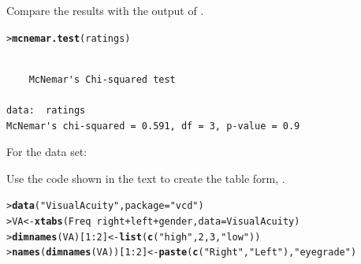 \documentclass[10pt]{report}\usepackage[]{graphicx}\usepackage[]{color}
\makeatletter
\newcommand{\hlnum}[1]{\textcolor[rgb]{0.686,0.059,0.569}{#1}}%
\newcommand{\hlstr}[1]{\textcolor[rgb]{0.192,0.494,0.8}{#1}}%
\newcommand{\hlopt}[1]{\textcolor[rgb]{0,0,0}{#1}}%
\newcommand{\hlstd}[1]{\textcolor[rgb]{0.345,0.345,0.345}{#1}}%
\newcommand{\hlkwb}[1]{\textcolor[rgb]{0.69,0.353,0.396}{#1}}%
\newcommand{\hlkwc}[1]{\textcolor[rgb]{0.333,0.667,0.333}{#1}}%
\newcommand{\hlkwd}[1]{\textcolor[rgb]{0.737,0.353,0.396}{\textbf{#1}}}%
\newenvironment{kframe}{%
 \def\at@end@of@kframe{}%
 \ifinner\ifhmode%
  \def\at@end@of@kframe{\end{minipage}}%
  \begin{minipage}{\columnwidth}%
 \fi\fi%
 \def\FrameCommand##1{\hskip\@totalleftmargin \hskip-\fboxsep
 \colorbox{shadecolor}{##1}\hskip-\fboxsep
     \hskip-\linewidth \hskip-\@totalleftmargin \hskip\columnwidth}%
 \MakeFramed {\advance\hsize-\width
   \@totalleftmargin\z@ \linewidth\hsize
   \@setminipage}}%
 {\par\unskip\endMakeFramed%
 \at@end@of@kframe}
\newenvironment{knitrout}{}{} %
\renewenvironment{knitrout}{\small\renewcommand{\baselinestretch}{.85}}{} %
\makeatother
\begin{document}
\begin{Exercises}
\begin{enumerate*}
\begin{ans}
     \end{ans}
     
     \item Compare the results with the output of .
     \begin{ans}
\begin{knitrout}\footnotesize
{}\color{fgcolor}\begin{kframe}
\begin{alltt}
\hlstd{> }\hlkwd{mcnemar.test}\hlstd{(ratings)}
\end{alltt}
\begin{verbatim}

	McNemar's Chi-squared test

data:  ratings
McNemar's chi-squared = 0.591, df = 3, p-value = 0.9
\end{verbatim}
\end{kframe}
\end{knitrout}
     \end{ans}
     
     \end{enumerate*}

  \exercise For the  data set:
    \begin{enumerate*}
      \item Use the code shown in the text to create the table form, .
      \begin{ans}
\begin{knitrout}\footnotesize
{}\color{fgcolor}\begin{kframe}
\begin{alltt}
\hlstd{> }\hlkwd{data}\hlstd{(}\hlstr{"VisualAcuity"}\hlstd{,} \hlkwc{package} \hlstd{=} \hlstr{"vcd"}\hlstd{)}
\hlstd{> }\hlstd{VA} \hlkwb{<-} \hlkwd{xtabs}\hlstd{(Freq} \hlopt{~} \hlstd{right} \hlopt{+} \hlstd{left} \hlopt{+} \hlstd{gender,} \hlkwc{data} \hlstd{= VisualAcuity)}
\hlstd{> }\hlkwd{dimnames}\hlstd{(VA)[}\hlnum{1}\hlopt{:}\hlnum{2}\hlstd{]} \hlkwb{<-} \hlkwd{list}\hlstd{(}\hlkwd{c}\hlstd{(}\hlstr{"high"}\hlstd{,} \hlnum{2}\hlstd{,} \hlnum{3}\hlstd{,} \hlstr{"low"}\hlstd{))}
\hlstd{> }\hlkwd{names}\hlstd{(}\hlkwd{dimnames}\hlstd{(VA))[}\hlnum{1}\hlopt{:}\hlnum{2}\hlstd{]} \hlkwb{<-} \hlkwd{paste}\hlstd{(}\hlkwd{c}\hlstd{(}\hlstr{"Right"}\hlstd{,} \hlstr{"Left"}\hlstd{),} \hlstr{"eye grade"}\hlstd{)}
\end{alltt}
\end{kframe}
\end{knitrout}
      \end{ans}
      

\end{enumerate*}
\end{Exercises}
\end{document}
